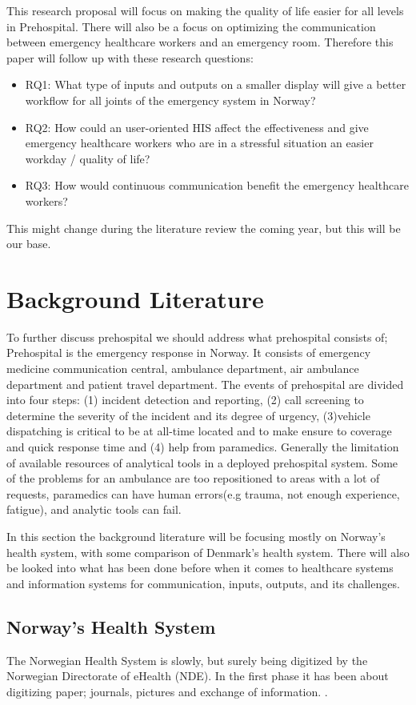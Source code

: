 \documentclass[fleqn,10pt]{wlscirep}
\begin{document}
This research proposal will focus on making the quality of life easier for all levels in Prehospital. There will also be a focus on optimizing the communication between emergency healthcare workers  and an emergency room. Therefore this paper will follow up with these research questions:
\begin{itemize}
\item[] RQ1: What type of inputs and outputs on a smaller display will give a better workflow for all joints of the emergency system in Norway? 
\item[] RQ2: How could an user-oriented HIS affect the effectiveness and give emergency healthcare workers who are in a stressful situation an easier workday / quality of life? 
\item[] RQ3: How would continuous communication benefit the emergency healthcare workers? 
\end{itemize}
This might change during the literature review the coming year, but this will be our base. 
\section{Background Literature}
To further discuss prehospital we should address what prehospital consists of; Prehospital is the emergency response in Norway. It consists of emergency medicine communication central, ambulance department, air ambulance department and patient travel department\cite{M_Kilde1}. The events of prehospital are divided into four steps\cite{Kilde1}: (1) incident detection and reporting, (2) call screening to determine the severity of the incident and its degree of urgency, (3)vehicle dispatching is critical to be at all-time located and to make ensure to coverage and quick response time and (4) help from paramedics. Generally the limitation of available resources of analytical tools in a deployed prehospital system. Some of the problems for an ambulance are too repositioned to areas with a lot of requests, paramedics can have human errors\cite{Kilde2}(e.g trauma, not enough experience, fatigue), and analytic tools can fail. 

In this section the background literature will be focusing mostly on Norway’s health system, with some comparison of Denmark’s health system. There will also be looked into what has been done before when it comes to healthcare systems and information systems for communication, inputs, outputs, and its challenges. 

\subsection{Norway's Health System}
The Norwegian Health System is slowly, but surely being digitized by the Norwegian Directorate of eHealth (NDE). In the first phase it has been about digitizing paper; journals, pictures and exchange of information. \cite{M_Kilde2}.
\end{document}
